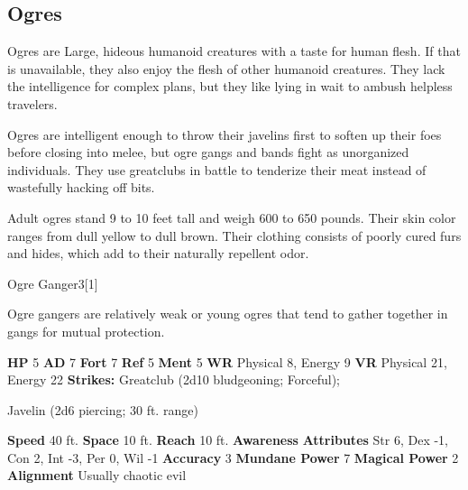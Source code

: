     \subsection{Ogres}
      
      Ogres are Large, hideous humanoid creatures with a taste for human flesh.
      If that is unavailable, they also enjoy the flesh of other humanoid creatures.
      They lack the intelligence for complex plans, but they like lying in wait to ambush helpless travelers.
    
      Ogres are intelligent enough to throw their javelins first to soften up their foes before closing into melee, but ogre gangs and bands fight as unorganized individuals.
      They use greatclubs in battle to tenderize their meat instead of wastefully hacking off bits.

      Adult ogres stand 9 to 10 feet tall and weigh 600 to 650 pounds.
      Their skin color ranges from dull yellow to dull brown.
      Their clothing consists of poorly cured furs and hides, which add to their naturally repellent odor.
    

      
  \begin{monsubsection}{Ogre Ganger}{3}[1]
    \vspace{-1em}\vspace{-1em}
    \vspace{0em}

    
          Ogre gangers are relatively weak or young ogres that tend to gather together in gangs for mutual protection.
        

    \begin{spellcontent}
      \begin{spelltargetinginfo}
        \pari \textbf{HP} 5 \monsep
          \textbf{AD} 7 \monsep
          \textbf{Fort} 7 \monsep
          \textbf{Ref} 5 \monsep
          \textbf{Ment} 5
        \pari \textbf{WR} Physical 8, Energy 9 \monsep
        \textbf{VR} Physical 21, Energy 22
        \pari \textbf{Strikes:}
            Greatclub  (2d10 bludgeoning; Forceful);
\par Javelin  (2d6 piercing; 30 ft. range)
      \end{spelltargetinginfo}
    \end{spellcontent}
    \begin{monsterfooter}
      \pari \textbf{Speed} 40 ft. \monsep
        \textbf{Space} 10 ft. \monsep
        \textbf{Reach} 10 ft.
      \pari \textbf{Awareness} 
      \pari \textbf{Attributes}
        Str 6, Dex -1,
        Con 2, Int -3,
        Per 0, Wil -1
      \pari \textbf{Accuracy} 3 \monsep
        \textbf{Mundane Power} 7 \monsep
      \textbf{Magical Power} 2
      \pari \textbf{Alignment} Usually chaotic evil
    \end{monsterfooter}
  \end{monsubsection}
  

